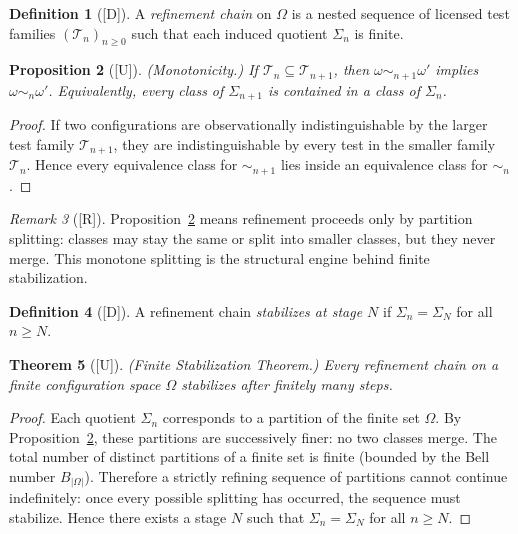 \documentclass[12pt,oneside]{amsbook}
\theoremstyle{plain}
\newtheorem{theorem}{Theorem}[section]
\newtheorem{proposition}[theorem]{Proposition}
\theoremstyle{definition}
\newtheorem{definition}[theorem]{Definition}
\theoremstyle{remark}
\newtheorem{remark}[theorem]{Remark}
\newcommand{\status}[1]{\textup{[#1]}}
\begin{document}
\begin{definition}[\status{D}]\label{def:refinement-chain}
A \emph{refinement chain} on $\Omega$ is a nested sequence of licensed
test families $(\mathcal{T}_n)_{n \geq 0}$ such that each induced
quotient $\Sigma_n$ is finite.
\end{definition}

\begin{proposition}[\status{U}]\label{prop:monotone}
\textup{(Monotonicity.)}  If $\mathcal{T}_n \subseteq
\mathcal{T}_{n+1}$, then $\omega \sim_{n+1} \omega'$ implies $\omega
\sim_n \omega'$.  Equivalently, every class of $\Sigma_{n+1}$ is
contained in a class of $\Sigma_n$.
\end{proposition}

\begin{proof}
If two configurations are observationally indistinguishable by the
larger test family $\mathcal{T}_{n+1}$, they are indistinguishable by
every test in the smaller family $\mathcal{T}_n$.  Hence every
equivalence class for $\sim_{n+1}$ lies inside an equivalence class
for $\sim_n$.
\end{proof}

\begin{remark}[\status{R}]
Proposition~\ref{prop:monotone} means refinement proceeds only by
partition splitting: classes may stay the same or split into smaller
classes, but they never merge.  This monotone splitting is the
structural engine behind finite stabilization.
\end{remark}

\begin{definition}[\status{D}]\label{def:stabilization}
A refinement chain \emph{stabilizes at stage $N$} if
$\Sigma_n = \Sigma_N$ for all $n \geq N$.
\end{definition}

\begin{theorem}[\status{U}]\label{thm:stabilization}
\textup{(Finite Stabilization Theorem.)}  Every refinement chain on a
finite configuration space $\Omega$ stabilizes after finitely many
steps.
\end{theorem}

\begin{proof}
Each quotient $\Sigma_n$ corresponds to a partition of the finite set
$\Omega$.  By Proposition~\ref{prop:monotone}, these partitions are
successively finer: no two classes merge.  The total number of
distinct partitions of a finite set is finite (bounded by the Bell
number $B_{|\Omega|}$).  Therefore a strictly refining sequence of
partitions cannot continue indefinitely: once every possible splitting
has occurred, the sequence must stabilize.  Hence there exists a stage
$N$ such that $\Sigma_n = \Sigma_N$ for all $n \geq N$.
\end{proof}
\end{document}
